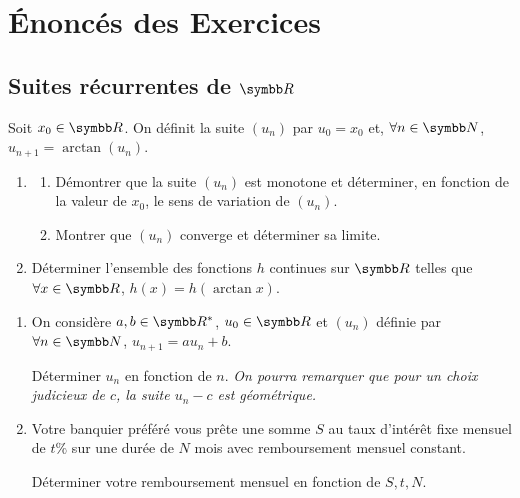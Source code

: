 \section{Énoncés des Exercices}
\subsection{Suites récurrentes de \texorpdfstring{$\R$}{R}}

\begin{exercice}
    Soit $x_{0}\in\R$. On définit la suite $(u_{n})$ par $u_{0}=x_{0}$ et, $\forall n\in\N$, $u_{n+1}=\arctan(u_{n}).$
    \begin{enumerate}
        \item 
        \begin{enumerate}
            \item Démontrer que la suite $(u_{n})$ est monotone et déterminer, en fonction de la valeur de $x_{0}$, le sens de variation de $(u_{n})$.
            \item Montrer que $(u_{n})$ converge et déterminer sa limite.
        \end{enumerate}
        \item Déterminer l'ensemble des fonctions $h$ continues sur $\R$ telles que $\forall x\in\R$, $h(x)=h(\arctan x)$.
    \end{enumerate}
\end{exercice}

\begin{exercice}
\begin{enumerate}
    \item On considère $a, b\in\R^{*}$, $u_{0}\in\R$ et $(u_{n})$ définie par $\forall n\in\N$, $u_{n+1}=au_{n}+b$.

    Déterminer $u_{n}$ en fonction de $n$.
    \textit{On pourra remarquer que pour un choix judicieux de $c$, la suite $u_{n}-c$ est géométrique.}

    \item 
        Votre banquier préféré vous prête une somme $S$ au taux d'intérêt fixe mensuel de $t\%$ sur une durée de $N$ mois avec remboursement mensuel constant.

        Déterminer votre remboursement mensuel en fonction de $S, t, N$.
\end{enumerate}
\end{exercice}

